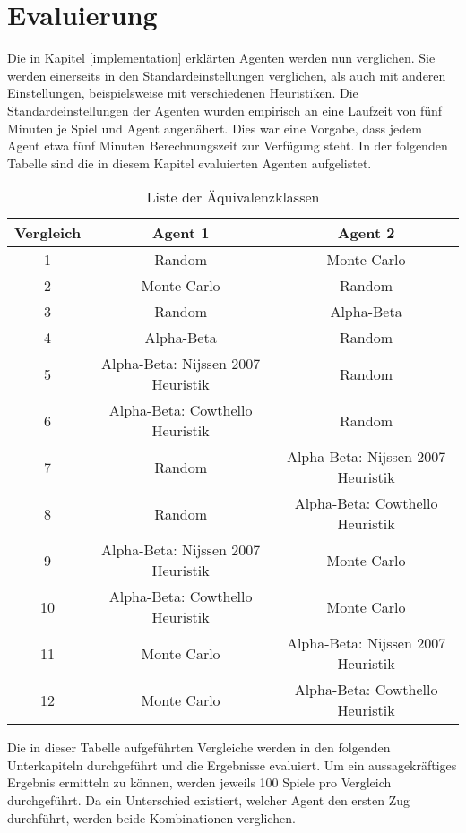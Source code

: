 \chapter{Evaluierung}
Die in Kapitel \ref{implementation} erklärten Agenten werden nun verglichen. Sie werden einerseits in den Standardeinstellungen verglichen, als auch mit anderen Einstellungen, beispielsweise mit verschiedenen Heuristiken. Die Standardeinstellungen der Agenten wurden empirisch an eine Laufzeit von fünf Minuten je Spiel und Agent angenähert. Dies war eine Vorgabe, dass jedem Agent etwa fünf Minuten Berechnungszeit zur Verfügung steht.
In der folgenden Tabelle sind die in diesem Kapitel evaluierten Agenten aufgelistet.
\begin{table}[ht]
\begin{center}
\begin{tabular}{| c | c | c |} \hline
Vergleich & Agent 1 & Agent 2 \\ \hline
1 & Random & Monte Carlo  \\ \hline
2 & Monte Carlo & Random\\ \hline
3 & Random & Alpha-Beta\\ \hline
4 & Alpha-Beta & Random\\ \hline
5 & Alpha-Beta: Nijssen 2007 Heuristik & Random\\ \hline
6 & Alpha-Beta: Cowthello Heuristik & Random\\ \hline
7 & Random & Alpha-Beta: Nijssen 2007 Heuristik \\ \hline
8 & Random & Alpha-Beta: Cowthello Heuristik \\ \hline
9 & Alpha-Beta: Nijssen 2007 Heuristik & Monte Carlo\\ \hline
10 & Alpha-Beta: Cowthello Heuristik & Monte Carlo\\ \hline
11 & Monte Carlo & Alpha-Beta: Nijssen 2007 Heuristik \\ \hline
12 & Monte Carlo & Alpha-Beta: Cowthello Heuristik \\ \hline
\end{tabular}
\end{center}
\caption{Liste der Äquivalenzklassen}
\label{agents1}
\end{table}

Die in dieser Tabelle aufgeführten Vergleiche werden in den folgenden Unterkapiteln durchgeführt und die Ergebnisse evaluiert.
Um ein aussagekräftiges Ergebnis ermitteln zu können, werden jeweils 100 Spiele pro Vergleich durchgeführt. Da ein Unterschied existiert, welcher Agent den ersten Zug durchführt, werden beide Kombinationen verglichen.
